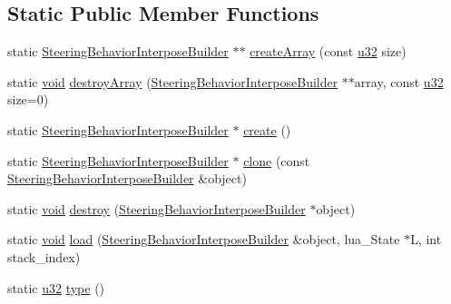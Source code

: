 \subsection*{Static Public Member Functions}
\begin{DoxyCompactItemize}
\item 
static \mbox{\hyperlink{classnjli_1_1_steering_behavior_interpose_builder}{Steering\+Behavior\+Interpose\+Builder}} $\ast$$\ast$ \mbox{\hyperlink{classnjli_1_1_steering_behavior_interpose_builder_a497220c9d37e14cf1979d85abdf45d01}{create\+Array}} (const \mbox{\hyperlink{_util_8h_a10e94b422ef0c20dcdec20d31a1f5049}{u32}} size)
\item 
static \mbox{\hyperlink{_thread_8h_af1e856da2e658414cb2456cb6f7ebc66}{void}} \mbox{\hyperlink{classnjli_1_1_steering_behavior_interpose_builder_aab0057888dbb1106bddda16f4a8ac1f9}{destroy\+Array}} (\mbox{\hyperlink{classnjli_1_1_steering_behavior_interpose_builder}{Steering\+Behavior\+Interpose\+Builder}} $\ast$$\ast$array, const \mbox{\hyperlink{_util_8h_a10e94b422ef0c20dcdec20d31a1f5049}{u32}} size=0)
\item 
static \mbox{\hyperlink{classnjli_1_1_steering_behavior_interpose_builder}{Steering\+Behavior\+Interpose\+Builder}} $\ast$ \mbox{\hyperlink{classnjli_1_1_steering_behavior_interpose_builder_a4fe8d861e5eb67fc6c7f0367da73d2f8}{create}} ()
\item 
static \mbox{\hyperlink{classnjli_1_1_steering_behavior_interpose_builder}{Steering\+Behavior\+Interpose\+Builder}} $\ast$ \mbox{\hyperlink{classnjli_1_1_steering_behavior_interpose_builder_a1358912326273917e2654b1b8a6923ad}{clone}} (const \mbox{\hyperlink{classnjli_1_1_steering_behavior_interpose_builder}{Steering\+Behavior\+Interpose\+Builder}} \&object)
\item 
static \mbox{\hyperlink{_thread_8h_af1e856da2e658414cb2456cb6f7ebc66}{void}} \mbox{\hyperlink{classnjli_1_1_steering_behavior_interpose_builder_a5ef4cd3991f5e1dc151aa7f48c05e64e}{destroy}} (\mbox{\hyperlink{classnjli_1_1_steering_behavior_interpose_builder}{Steering\+Behavior\+Interpose\+Builder}} $\ast$object)
\item 
static \mbox{\hyperlink{_thread_8h_af1e856da2e658414cb2456cb6f7ebc66}{void}} \mbox{\hyperlink{classnjli_1_1_steering_behavior_interpose_builder_ac3bb5b08cfd011aab3d8f8750301d248}{load}} (\mbox{\hyperlink{classnjli_1_1_steering_behavior_interpose_builder}{Steering\+Behavior\+Interpose\+Builder}} \&object, lua\+\_\+\+State $\ast$L, int stack\+\_\+index)
\item 
static \mbox{\hyperlink{_util_8h_a10e94b422ef0c20dcdec20d31a1f5049}{u32}} \mbox{\hyperlink{classnjli_1_1_steering_behavior_interpose_builder_aea9a5c0db93808fbf297db37b071535d}{type}} ()
\end{DoxyCompactItemize}
